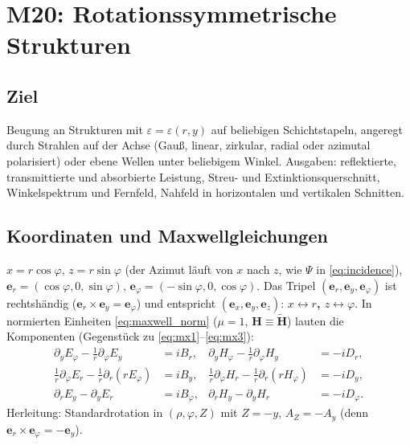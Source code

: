 \section{M20: Rotationssymmetrische Strukturen}\label{sec:cyl}

\subsection{Ziel}
Beugung an Strukturen mit $\varepsilon=\varepsilon(r,y)$ auf beliebigen Schichtstapeln, angeregt durch Strahlen auf der
Achse (Gauß, linear, zirkular, radial oder azimutal polarisiert) oder ebene Wellen unter beliebigem Winkel. Ausgaben:
reflektierte, transmittierte und absorbierte Leistung, Streu- und Extinktionsquerschnitt, Winkelspektrum und
Fernfeld, Nahfeld in horizontalen und vertikalen Schnitten.

\subsection{Koordinaten und Maxwellgleichungen}
$x=r\cos\varphi$, $z=r\sin\varphi$ (der Azimut läuft von $x$ nach $z$, wie $\Psi$ in \eqref{eq:incidence}),
$\mathbf e_r=(\cos\varphi,0,\sin\varphi)$, $\mathbf e_\varphi=(-\sin\varphi,0,\cos\varphi)$. Das Tripel
$(\mathbf e_r,\mathbf e_y,\mathbf e_\varphi)$ ist rechtshändig ($\mathbf e_r\times\mathbf e_y=\mathbf e_\varphi$) und
entspricht $(\mathbf e_x,\mathbf e_y,\mathbf e_z)$: \textbf{$x\leftrightarrow r$, $z\leftrightarrow\varphi$}. In normierten
Einheiten \eqref{eq:maxwell_norm} ($\mu=1$, $\mathbf H\equiv\tilde{\mathbf H}$) lauten die Komponenten (Gegenstück zu
\eqref{eq:mx1}--\eqref{eq:mx3}):
\begin{align}
  \partial_yE_\varphi-\tfrac1r\partial_\varphi E_y&=iB_r, &
  \partial_yH_\varphi-\tfrac1r\partial_\varphi H_y&=-iD_r,\label{eq:cyl_mx1}\\
  \tfrac1r\partial_\varphi E_r-\tfrac1r\partial_r(rE_\varphi)&=iB_y, &
  \tfrac1r\partial_\varphi H_r-\tfrac1r\partial_r(rH_\varphi)&=-iD_y,\label{eq:cyl_mx2}\\
  \partial_rE_y-\partial_yE_r&=iB_\varphi, & \partial_rH_y-\partial_yH_r&=-iD_\varphi .\label{eq:cyl_mx3}
\end{align}
Herleitung: Standardrotation in $(\rho,\varphi,Z)$ mit $Z=-y$, $A_Z=-A_y$ (denn $\mathbf e_r\times\mathbf e_\varphi=-\mathbf e_y$).


